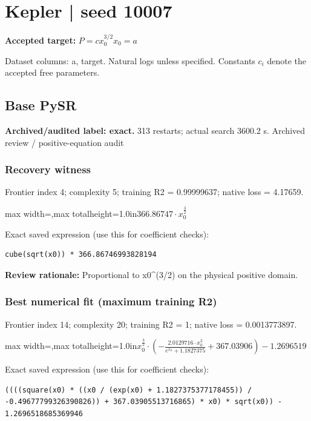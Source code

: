 \documentclass[10pt,letterpaper,landscape]{article}
\begin{document}
\section*{Kepler | seed 10007}
\textbf{Accepted target:} $\displaystyle P=c x_0^{3/2}$\hfill $x_0=a$\par
{\small Dataset columns: a, target. Natural logs unless specified. Constants $c_i$ denote the accepted free parameters.}\par\medskip
\begin{minipage}[t]{0.485\textwidth}
\subsection*{Base PySR}
\textbf{Archived/audited label: exact.} 313 restarts; actual search 3600.2 s.
{\small Archived review / positive-equation audit}
\subsubsection*{Recovery witness}
Frontier index 4; complexity 5; training R2 = 0.99999637; native loss = 4.17659.
\begin{center}\begin{adjustbox}{max width=\linewidth,max totalheight=1.0in}$\displaystyle 366.86747 \cdot x_{0}^{\frac{3}{2}}$\end{adjustbox}\end{center}
{\scriptsize Exact saved expression (use this for coefficient checks):}
\begin{lstlisting}
cube(sqrt(x0)) * 366.86746993828194
\end{lstlisting}
{\small\textbf{Review rationale:} Proportional to x0\textasciicircum{}(3/2) on the physical positive domain.}
\subsubsection*{Best numerical fit (maximum training R2)}
Frontier index 14; complexity 20; training R2 = 1; native loss = 0.0013773897.
\begin{center}\begin{adjustbox}{max width=\linewidth,max totalheight=1.0in}$\displaystyle x_{0}^{\frac{3}{2}} \cdot \left(- \frac{2.0129716 \cdot x_{0}^{3}}{e^{x_{0}} + 1.1827375} + 367.03906\right) - 1.2696519$\end{adjustbox}\end{center}
{\scriptsize Exact saved expression (use this for coefficient checks):}
\begin{lstlisting}
((((square(x0) * ((x0 / (exp(x0) + 1.1827375377178455)) / -0.49677799326390826)) + 367.03905513716865) * x0) * sqrt(x0)) - 1.2696518685369946
\end{lstlisting}
\end{minipage}\hfill
\end{document}
